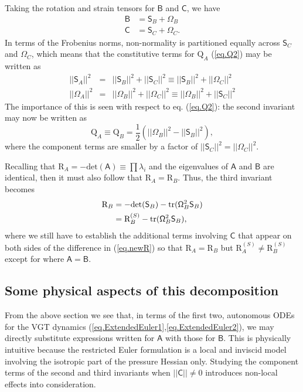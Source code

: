 \documentclass[preprint,amssymb,amsmath,aip,cha]{revtex4-1}
\begin{document}
Taking the rotation and strain tensors for $\mathsf{B}$ and $\mathsf{C}$, we have
\begin{align}
\mathsf{B} &= \mathsf{S}_{B} + \mathsf{\Omega}_{B} \\
\mathsf{C} &= \mathsf{S}_{C} + \mathsf{\Omega}_{C}.
\end{align}
In terms of the Frobenius norms, non-normality is partitioned equally across $\mathsf{S}_{C}$ and $\mathsf{\Omega}_{C}$, which means that the constitutive terms for $\mbox{Q}_{A}$ (\ref{eq.Q2}) may be written as
\begin{eqnarray}
||\mathsf{S}_{A}||^{2} &=& ||\mathsf{S}_{B}||^{2} + ||\mathsf{S}_{C}||^{2} \equiv ||\mathsf{S}_{B}||^{2} + ||\mathsf{\Omega}_{C}||^{2} \\
||\mathsf{\Omega}_{A}||^{2} &=& ||\mathsf{\Omega}_{B}||^{2} + ||\mathsf{\Omega}_{C}||^{2} \equiv ||\mathsf{\Omega}_{B}||^{2} + ||\mathsf{S}_{C}||^{2}
\label{eq.newOmSA}
\end{eqnarray}
The importance of this is seen with respect to eq. (\ref{eq.Q2}): the second invariant may now be written as
\begin{equation}
\mbox{Q}_{A} \equiv \mbox{Q}_{B} = \frac{1}{2}\left(||\mathsf{\Omega}_{B}||^{2} - ||\mathsf{S}_{B}||^{2}\right),
\label{eq.newQ}
\end{equation}
where the component terms are smaller by a factor of $||\mathsf{S}_{C}||^{2}=||\mathsf{\Omega}_{C}||^{2}$.

Recalling that $\mbox{R}_{A} = -\mbox{det}(\mathsf{A}) \equiv \prod \lambda_{i}$ and the eigenvalues of $\mathsf{A}$ and $\mathsf{B}$ are identical, then it must also follow that $\mbox{R}_{A} = \mbox{R}_{B}$. Thus, the third invariant becomes
\begin{align}
\label{eq.newR}
\mbox{R}_{B} &= -\mbox{det}(\mathsf{S}_{B}) - \mbox{tr}(\mathsf{\Omega}_{B}^{2}\mathsf{S}_{B})\\
\notag{}
&= \mbox{R}^{(S)}_{B} - \mbox{tr}(\mathsf{\Omega}_{B}^{2}\mathsf{S}_{B}),
\end{align}
where we still have to establish the additional terms involving $\mathsf{C}$ that appear on both sides of the difference in (\ref{eq.newR}) so that $\mbox{R}_{A} = \mbox{R}_{B}$ but $\mbox{R}^{(S)}_{A} \ne \mbox{R}^{(S)}_{B}$ except for where $\mathsf{A} = \mathsf{B}$.

\subsection{Some physical aspects of this decomposition}
\label{sect.physical}
From the above section we see that, in terms of the first two, autonomous ODEs for the VGT dynamics (\ref{eq.ExtendedEuler1},\ref{eq.ExtendedEuler2}), we may directly substitute expressions written for $\mathsf{A}$ with those for $\mathsf{B}$. This is physically intuitive because the restricted Euler formulation is a local and inviscid model involving the isotropic part of the pressure Hessian only. Studying the component terms of the second and third invariants when $||\mathsf{C}|| \ne 0$ introduces non-local effects into consideration. 
\end{document}
